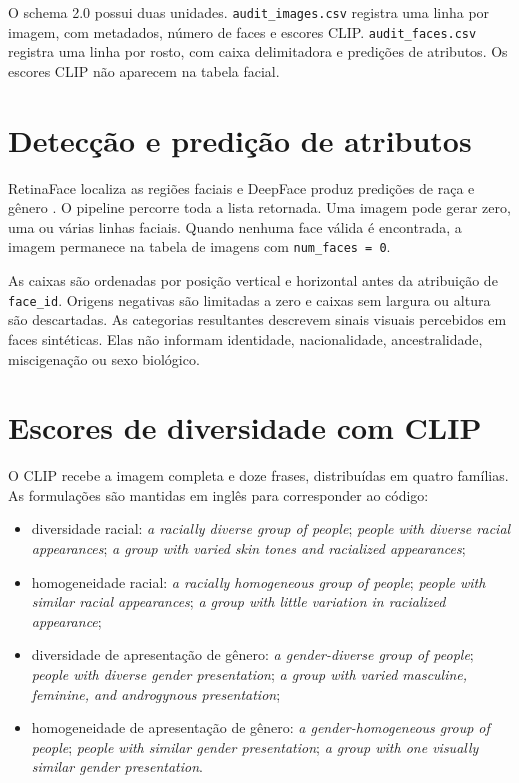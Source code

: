 O schema 2.0 possui duas unidades. \texttt{audit\_\allowbreak images.csv} registra uma linha por imagem, com metadados, número de faces e escores CLIP. \texttt{audit\_\allowbreak faces.csv} registra uma linha por rosto, com caixa delimitadora e predições de atributos. Os escores CLIP não aparecem na tabela facial.

\section{Detecção e predição de atributos}

RetinaFace localiza as regiões faciais e DeepFace produz predições de raça e gênero \cite{serengil2026boosted}. O pipeline percorre toda a lista retornada. Uma imagem pode gerar zero, uma ou várias linhas faciais. Quando nenhuma face válida é encontrada, a imagem permanece na tabela de imagens com \texttt{num\_faces = 0}.

As caixas são ordenadas por posição vertical e horizontal antes da atribuição de \texttt{face\_id}. Origens negativas são limitadas a zero e caixas sem largura ou altura são descartadas. As categorias resultantes descrevem sinais visuais percebidos em faces sintéticas. Elas não informam identidade, nacionalidade, ancestralidade, miscigenação ou sexo biológico.

\section{Escores de diversidade com CLIP}

O CLIP recebe a imagem completa e doze frases, distribuídas em quatro famílias. As formulações são mantidas em inglês para corresponder ao código:

\begin{itemize}
    \item diversidade racial: \textit{a racially diverse group of people}; \textit{people with diverse racial appearances}; \textit{a group with varied skin tones and racialized appearances};
    \item homogeneidade racial: \textit{a racially homogeneous group of people}; \textit{people with similar racial appearances}; \textit{a group with little variation in racialized appearance};
    \item diversidade de apresentação de gênero: \textit{a gender-diverse group of people}; \textit{people with diverse gender presentation}; \textit{a group with varied masculine, feminine, and androgynous presentation};
    \item homogeneidade de apresentação de gênero: \textit{a gender-homogeneous group of people}; \textit{people with similar gender presentation}; \textit{a group with one visually similar gender presentation}.
\end{itemize}

